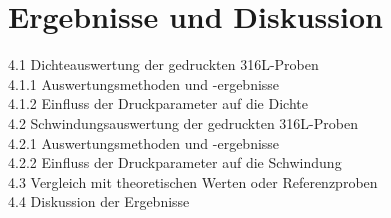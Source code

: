 \chapter{Ergebnisse und Diskussion}

4.1 Dichteauswertung der gedruckten 316L-Proben\\
4.1.1 Auswertungsmethoden und -ergebnisse\\
4.1.2 Einfluss der Druckparameter auf die Dichte\\
4.2 Schwindungsauswertung der gedruckten 316L-Proben\\
4.2.1 Auswertungsmethoden und -ergebnisse\\
4.2.2 Einfluss der Druckparameter auf die Schwindung\\
4.3 Vergleich mit theoretischen Werten oder Referenzproben\\
4.4 Diskussion der Ergebnisse